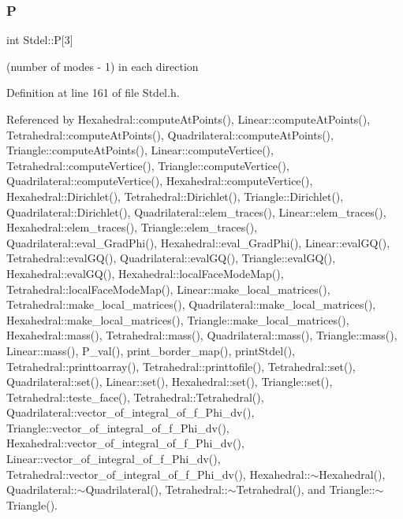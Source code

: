 \mbox{\label{classStdel_a05cbb3f2a3fa0bc04a74e347dc6574cf}} 
\subsubsection{\texorpdfstring{P}{P}}
{\footnotesize\ttfamily int Stdel\+::P\mbox{[}3\mbox{]}\hspace{0.3cm}{\ttfamily [protected]}}



(number of modes -\/ 1) in each direction 



Definition at line 161 of file Stdel.\+h.



Referenced by Hexahedral\+::compute\+At\+Points(), Linear\+::compute\+At\+Points(), Tetrahedral\+::compute\+At\+Points(), Quadrilateral\+::compute\+At\+Points(), Triangle\+::compute\+At\+Points(), Linear\+::compute\+Vertice(), Tetrahedral\+::compute\+Vertice(), Triangle\+::compute\+Vertice(), Quadrilateral\+::compute\+Vertice(), Hexahedral\+::compute\+Vertice(), Hexahedral\+::\+Dirichlet(), Tetrahedral\+::\+Dirichlet(), Triangle\+::\+Dirichlet(), Quadrilateral\+::\+Dirichlet(), Quadrilateral\+::elem\+\_\+traces(), Linear\+::elem\+\_\+traces(), Hexahedral\+::elem\+\_\+traces(), Triangle\+::elem\+\_\+traces(), Quadrilateral\+::eval\+\_\+\+Grad\+Phi(), Hexahedral\+::eval\+\_\+\+Grad\+Phi(), Linear\+::eval\+G\+Q(), Tetrahedral\+::eval\+G\+Q(), Quadrilateral\+::eval\+G\+Q(), Triangle\+::eval\+G\+Q(), Hexahedral\+::eval\+G\+Q(), Hexahedral\+::local\+Face\+Mode\+Map(), Tetrahedral\+::local\+Face\+Mode\+Map(), Linear\+::make\+\_\+local\+\_\+matrices(), Tetrahedral\+::make\+\_\+local\+\_\+matrices(), Quadrilateral\+::make\+\_\+local\+\_\+matrices(), Hexahedral\+::make\+\_\+local\+\_\+matrices(), Triangle\+::make\+\_\+local\+\_\+matrices(), Hexahedral\+::mass(), Tetrahedral\+::mass(), Quadrilateral\+::mass(), Triangle\+::mass(), Linear\+::mass(), P\+\_\+val(), print\+\_\+border\+\_\+map(), print\+Stdel(), Tetrahedral\+::printtoarray(), Tetrahedral\+::printtofile(), Tetrahedral\+::set(), Quadrilateral\+::set(), Linear\+::set(), Hexahedral\+::set(), Triangle\+::set(), Tetrahedral\+::teste\+\_\+face(), Tetrahedral\+::\+Tetrahedral(), Quadrilateral\+::vector\+\_\+of\+\_\+integral\+\_\+of\+\_\+f\+\_\+\+Phi\+\_\+dv(), Triangle\+::vector\+\_\+of\+\_\+integral\+\_\+of\+\_\+f\+\_\+\+Phi\+\_\+dv(), Hexahedral\+::vector\+\_\+of\+\_\+integral\+\_\+of\+\_\+f\+\_\+\+Phi\+\_\+dv(), Linear\+::vector\+\_\+of\+\_\+integral\+\_\+of\+\_\+f\+\_\+\+Phi\+\_\+dv(), Tetrahedral\+::vector\+\_\+of\+\_\+integral\+\_\+of\+\_\+f\+\_\+\+Phi\+\_\+dv(), Hexahedral\+::$\sim$\+Hexahedral(), Quadrilateral\+::$\sim$\+Quadrilateral(), Tetrahedral\+::$\sim$\+Tetrahedral(), and Triangle\+::$\sim$\+Triangle().

